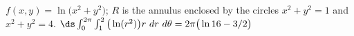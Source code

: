 {$f(x,y) = \ln\big(x^2+y^2)$; $R$ is the annulus enclosed by the circles $x^2+y^2=1$ and $x^2+y^2=4$.
}
{$\ds \int_0^{2\pi}\int_{1}^{2} \big(\ln(r^2)\big)r\ dr\ d\theta = 2\pi\big(\ln16-3/2\big)$
}